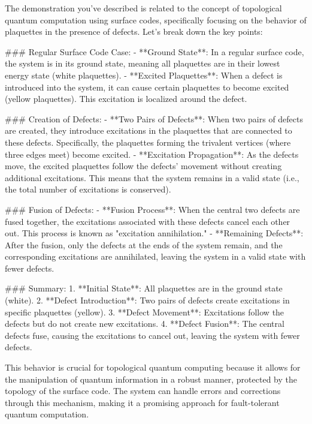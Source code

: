 The demonstration you've described is related to the concept of topological quantum computation using surface codes, specifically focusing on the behavior of plaquettes in the presence of defects. Let's break down the key points:

### Regular Surface Code Case:
- **Ground State**: In a regular surface code, the system is in its ground state, meaning all plaquettes are in their lowest energy state (white plaquettes).
- **Excited Plaquettes**: When a defect is introduced into the system, it can cause certain plaquettes to become excited (yellow plaquettes). This excitation is localized around the defect.

### Creation of Defects:
- **Two Pairs of Defects**: When two pairs of defects are created, they introduce excitations in the plaquettes that are connected to these defects. Specifically, the plaquettes forming the trivalent vertices (where three edges meet) become excited.
- **Excitation Propagation**: As the defects move, the excited plaquettes follow the defects' movement without creating additional excitations. This means that the system remains in a valid state (i.e., the total number of excitations is conserved).

### Fusion of Defects:
- **Fusion Process**: When the central two defects are fused together, the excitations associated with these defects cancel each other out. This process is known as "excitation annihilation."
- **Remaining Defects**: After the fusion, only the defects at the ends of the system remain, and the corresponding excitations are annihilated, leaving the system in a valid state with fewer defects.

### Summary:
1. **Initial State**: All plaquettes are in the ground state (white).
2. **Defect Introduction**: Two pairs of defects create excitations in specific plaquettes (yellow).
3. **Defect Movement**: Excitations follow the defects but do not create new excitations.
4. **Defect Fusion**: The central defects fuse, causing the excitations to cancel out, leaving the system with fewer defects.

This behavior is crucial for topological quantum computing because it allows for the manipulation of quantum information in a robust manner, protected by the topology of the surface code. The system can handle errors and corrections through this mechanism, making it a promising approach for fault-tolerant quantum computation.